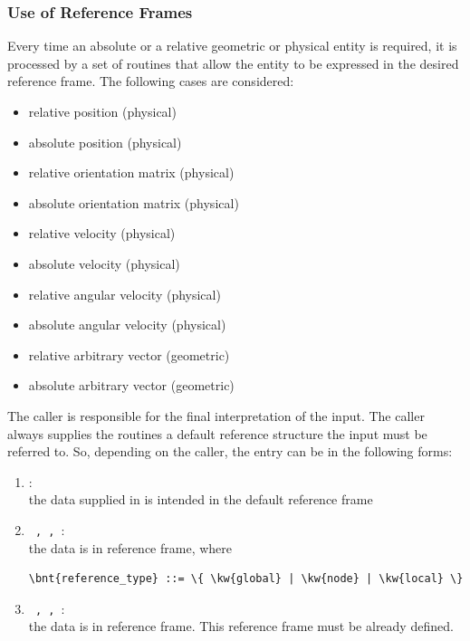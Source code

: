 \subsubsection{Use of Reference Frames}
Every time an absolute or a relative geometric or physical entity is
required, it is processed by a set of routines that allow the entity to be
expressed in the desired reference frame.
The following cases are considered:
\begin{itemize}
    \item relative position (physical)
    \item absolute position (physical)
    \item relative orientation matrix (physical)
    \item absolute orientation matrix (physical)
    \item relative velocity (physical)
    \item absolute velocity (physical)
    \item relative angular velocity (physical)
    \item absolute angular velocity (physical)
    \item relative arbitrary vector (geometric)
    \item absolute arbitrary vector (geometric)    
\end{itemize}
The caller is responsible for the final interpretation of the input. 
The caller always supplies the routines a default reference structure
the input must be referred to.
So, depending on the caller, the entry can be in the following forms:
\begin{enumerate}
\item {}: \\ 
	the data supplied in  is intended 
	in the default reference frame
\item \texttt{ ,  , }: \\
	the data is in  reference frame, where
\begin{Verbatim}[commandchars=\\\{\}]
        \bnt{reference_type} ::= \{ \kw{global} | \kw{node} | \kw{local} \}
\end{Verbatim}
\item \texttt{ ,  , }: \\
	the data is in  reference frame. 
	This reference frame must be already defined. 
\end{enumerate}
